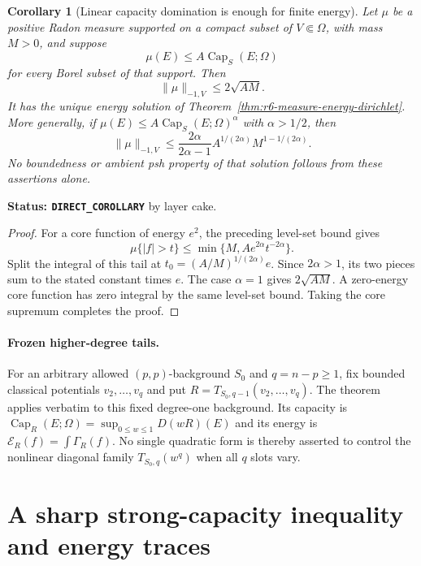 \documentclass[11pt,a4paper]{article}
\numberwithin{equation}{section}
\newtheorem{corollary}[theorem]{Corollary}
\theoremstyle{definition}
\theoremstyle{remark}
\begin{document}
\begin{corollary}[Linear capacity domination is enough for finite energy]
\label{cor:r6-linear-capacity-energy-data}
Let $\mu$ be a positive Radon measure supported on a compact subset of
$V\Subset\Omega$, with mass $M>0$, and suppose
\[
              \mu(E)\le A\operatorname{Cap}_S(E;\Omega)
\]
for every Borel subset of that support. Then
\[
                      \|\mu\|_{-1,V}\le2\sqrt{AM}.
\]
It has the unique energy solution of
Theorem~\ref{thm:r6-measure-energy-dirichlet}. More generally, if
$\mu(E)\le A\operatorname{Cap}_S(E;\Omega)^\alpha$ with
$\alpha>1/2$, then
\[
 \|\mu\|_{-1,V}
     \le\frac{2\alpha}{2\alpha-1}
             A^{1/(2\alpha)}M^{1-1/(2\alpha)}.
\]
No boundedness or ambient psh property of that solution follows from
these assertions alone.
\end{corollary}

\noindent\textbf{Status: \texttt{DIRECT\_COROLLARY}} by layer cake.

\begin{proof}
For a core function of energy $e^2$, the preceding level-set bound
gives
\[
              \mu\{|f|>t\}\le\min\{M,Ae^{2\alpha}t^{-2\alpha}\}.
\]
Split the integral of this tail at
$t_0=(A/M)^{1/(2\alpha)}e$. Since $2\alpha>1$, its two pieces sum
to the stated constant times $e$. The case $\alpha=1$ gives
$2\sqrt{AM}$. A zero-energy core function has zero integral by the
same level-set bound. Taking the core supremum completes the proof.
\end{proof}

\paragraph{Frozen higher-degree tails.}
For an arbitrary allowed $(p,p)$-background $S_0$ and
$q=n-p\ge1$, fix bounded classical potentials $v_2,\ldots,v_q$ and
put $R=T_{S_0,q-1}(v_2,\ldots,v_q)$. The theorem applies verbatim
to this fixed degree-one background. Its capacity is
$\operatorname{Cap}_R(E;\Omega)=\sup_{0\le w\le1}D(wR)(E)$ and
its energy is $\mathcal E_R(f)=\int\Gamma_R(f)$. No single quadratic
form is thereby asserted to control the nonlinear diagonal family
$T_{S_0,q}(w^q)$ when all $q$ slots vary.



\section{A sharp strong-capacity inequality and energy traces}
\label{sec:r6-strong-capacity-trace}
\end{document}
